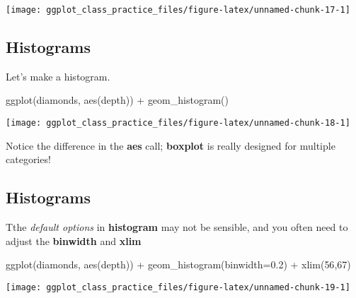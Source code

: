 \documentclass[
]{article}
\newenvironment{Shaded}{\begin{snugshade}}{\end{snugshade}}
\newcommand{\AttributeTok}[1]{\textcolor[rgb]{0.77,0.63,0.00}{#1}}
\newcommand{\DecValTok}[1]{\textcolor[rgb]{0.00,0.00,0.81}{#1}}
\newcommand{\FloatTok}[1]{\textcolor[rgb]{0.00,0.00,0.81}{#1}}
\newcommand{\FunctionTok}[1]{\textcolor[rgb]{0.00,0.00,0.00}{#1}}
\newcommand{\NormalTok}[1]{#1}
\newcommand{\SpecialCharTok}[1]{\textcolor[rgb]{0.00,0.00,0.00}{#1}}
\begin{document}
\begin{center}\texttt{[image: ggplot\_class\_practice\_files/figure-latex/unnamed-chunk-17-1]} \end{center}

\hypertarget{histograms}{%
\subsection{Histograms}\label{histograms}}

Let's make a histogram.

\begin{Shaded}
\begin{Highlighting}[]
\FunctionTok{ggplot}\NormalTok{(diamonds, }\FunctionTok{aes}\NormalTok{(depth)) }\SpecialCharTok{+} \FunctionTok{geom\_histogram}\NormalTok{()}
\end{Highlighting}
\end{Shaded}

\begin{center}\texttt{[image: ggplot\_class\_practice\_files/figure-latex/unnamed-chunk-18-1]} \end{center}

Notice the difference in the \textbf{aes} call; \textbf{boxplot} is
really designed for multiple categories!

\hypertarget{histograms-1}{%
\subsection{Histograms}\label{histograms-1}}

Tthe \emph{default options} in \textbf{histogram} may not be sensible,
and you often need to adjust the \textbf{binwidth} and \textbf{xlim}

\begin{Shaded}
\begin{Highlighting}[]
\FunctionTok{ggplot}\NormalTok{(diamonds, }\FunctionTok{aes}\NormalTok{(depth)) }\SpecialCharTok{+} \FunctionTok{geom\_histogram}\NormalTok{(}\AttributeTok{binwidth=}\FloatTok{0.2}\NormalTok{) }\SpecialCharTok{+} \FunctionTok{xlim}\NormalTok{(}\DecValTok{56}\NormalTok{,}\DecValTok{67}\NormalTok{)}
\end{Highlighting}
\end{Shaded}

\begin{center}\texttt{[image: ggplot\_class\_practice\_files/figure-latex/unnamed-chunk-19-1]} \end{center}
\end{document}
